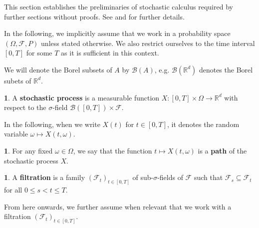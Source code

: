\documentclass[english]{article}
\newcommand{\comment}[1]{\color{blue}#1\color{black}}
\newcommand{\tomcomment}[1]{\color{orange}#1\color{black}}
\numberwithin{equation}{section}
\numberwithin{figure}{section}
\theoremstyle{bolddescit}
\theoremstyle{definition}
\newtheorem{definition}[theorem]{\protect\definitionname}
\theoremstyle{definition}
\theoremstyle{plain}
\theoremstyle{plain}
\theoremstyle{bolddesc}
\theoremstyle{plain}
\theoremstyle{remark}
\providecommand{\definitionname}{Definition}
\begin{document}
This section establishes the preliminaries of stochastic calculus required by further sections without proofs. See \textcite{capinski_stochastic_2012} and \textcite{capinski_blackscholes_2012} for further details.

In the following, we implicitly assume that we work in a probability space $(\Omega, \mathcal{F}, P)$ unless stated otherwise. We also restrict ourselves to
the time interval $[0,T]$ for some $T$ as it is sufficient in this context.


We will denote the Borel subsets of $A$ by $\mathcal{B}(A)$, e.g. $\mathcal{B}(\mathbb{R}^d)$ denotes the Borel subets of $\mathbb{R}^d$.

\begin{definition}
  A \textbf{stochastic process} is a measurable function $X : [0,T] \times \Omega \to \mathbb{R}^d$ with respect to the $\sigma$-field $\mathcal{B}([0,T]) \times \mathcal{F}$.
\end{definition}

In the following, when we write $X(t)$ for $t \in [0,T]$, it denotes the random variable $\omega \mapsto X(t, \omega)$.

\begin{definition}
  For any fixed $\omega \in \Omega$, we say that the function $t \mapsto X(t,\omega)$ is a \textbf{path} of the stochastic process $X$.
\end{definition}

\begin{definition}
  A \textbf{filtration} is a family $(\mathcal{F}_t)_{t \in [0,T]}$ of sub-$\sigma$-fields of $\mathcal{F}$ such that $\mathcal{F}_s \subseteq \mathcal{F}_t$ for all $0 \le s < t \le T$.
\end{definition}

From here onwards, we further assume when relevant that we work with a filtration $(\mathcal{F}_t)_{t \in [0,T]}$.
\end{document}
